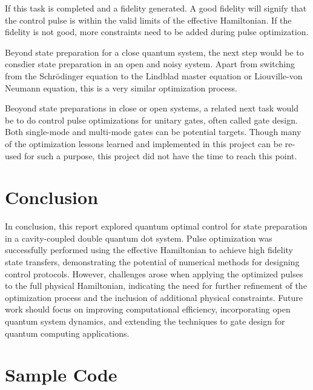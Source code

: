 \documentclass[12pt]{report}
\begin{document}
If this task is completed and a fidelity generated. A good fidelity will signify that the control pulse is within the valid limits of the effective Hamiltonian. 
If the fidelity is not good, more constraints need to be added during pulse optimization. 
\par
Beyond state preparation for a close quantum system, the next step would be to consdier state preparation in an open and noisy system. 
Apart from switching from the Schrödinger equation to the Lindblad master equation or Liouville-von Neumann equation, this is a very similar optimization process. 
\par
Beoyond state preparations in close or open systems, a related next task would be to do control pulse optimizations for unitary gates, often called gate design.
Both single-mode and multi-mode gates can be potential targets. Though many of the optimization lessons learned and implemented in this project can be re-used for such a purpose, this project did not have the time to reach this point. 

\chapter{Conclusion}
In conclusion, this report explored quantum optimal control for state preparation in a cavity-coupled double quantum dot system. 
Pulse optimization was successfully performed using the effective Hamiltonian to achieve high fidelity state transfers, demonstrating the potential of numerical methods for designing control protocols. 
However, challenges arose when applying the optimized pulses to the full physical Hamiltonian, indicating the need for further refinement of the optimization process and the inclusion of additional physical constraints. 
Future work should focus on improving computational efficiency, incorporating open quantum system dynamics, and extending the techniques to gate design for quantum computing applications.

\appendix
\chapter{Sample Code} \label{sec:sample_code}


\printbibliography
\end{document}
